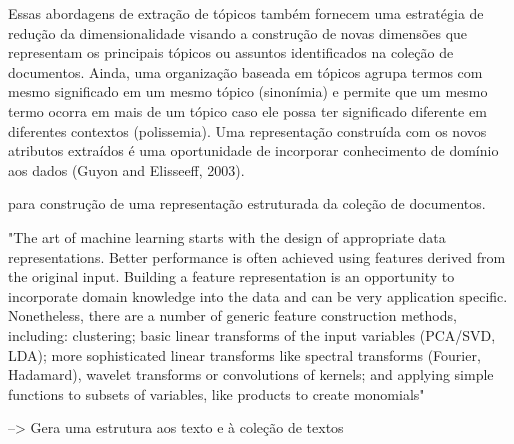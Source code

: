 








Essas abordagens de extração de tópicos também fornecem uma estratégia de redução da dimensionalidade visando a construção de novas dimensões que representam os principais tópicos ou assuntos identificados na coleção de documentos. Ainda, uma organização baseada em tópicos agrupa termos com mesmo significado em um mesmo tópico (sinonímia) e permite que um mesmo termo ocorra em mais de um tópico caso ele possa ter significado diferente em diferentes contextos (polissemia). Uma representação construída com os novos atributos extraídos é uma oportunidade de incorporar conhecimento de domínio aos dados (Guyon and Elisseeff, 2003).


para construção de uma representação estruturada da coleção de documentos.





"The art of machine learning starts with the design of appropriate data representations.  Better performance is often achieved using features derived from the original input. Building a feature representation is an opportunity to incorporate domain knowledge into the data and can be very application specific. Nonetheless, there are a number of generic feature construction methods, including: clustering; basic linear transforms of the input variables (PCA/SVD, LDA); more sophisticated linear transforms like spectral transforms (Fourier, Hadamard), wavelet transforms or convolutions of kernels; and applying simple functions to subsets of variables, like products to create monomials"







--> Gera uma estrutura aos texto e à coleção de textos



